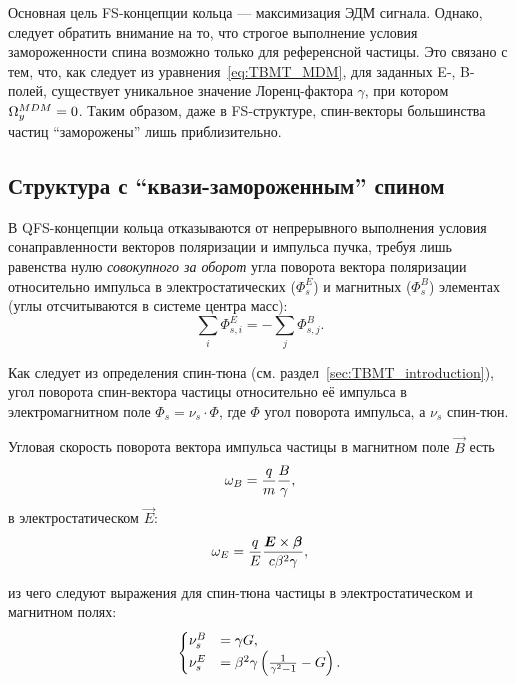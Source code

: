 Основная цель FS-концепции кольца --- максимизация ЭДМ сигнала. Однако, следует обратить внимание на то, что строгое выполнение условия замороженности спина возможно только для референсной частицы. Это связано с тем, что, как следует из уравнения~\eqref{eq:TBMT_MDM}, для заданных E-, B-полей, существует уникальное значение Лоренц-фактора $\gamma$, при котором $\Omega_y^{MDM} = 0$. Таким образом, даже в FS-структуре, спин-векторы большинства частиц ``заморожены'' лишь приблизительно.

\subsection{Структура с ``квази-замороженным'' спином} \label{chpt2:concept:QFS}
В QFS-концепции кольца отказываются от непрерывного выполнения условия сонаправленности векторов поляризации и импульса пучка, требуя лишь равенства нулю \emph{совокупного за оборот} угла поворота вектора поляризации относительно импульса в электростатических ($\Phi_s^E$) и магнитных ($\Phi_s^B$) элементах (углы отсчитываются в системе центра масс):~\cite{Senichev:Lattices}
\begin{equation*}
	\sum_i \Phi_{s,i}^E = -\sum_j \Phi_{s,j}^B.
\end{equation*}

Как следует из определения спин-тюна (см. раздел~\ref{sec:TBMT_introduction}), угол поворота спин-вектора частицы относительно её импульса в электромагнитном поле $\Phi_s = \nu_s \cdot \Phi$, где $\Phi$ угол поворота импульса, а $\nu_s$ спин-тюн.

Угловая скорость поворота вектора импульса частицы в магнитном поле $\vec B$ есть 
\[
\omega_B = \frac qm \frac B \gamma,
\]
в электростатическом $\vec E$:
\[
\omega_E = \frac qE \frac{\boldsymbol E\times \boldsymbol\beta}{c\beta^2\gamma},
\]

из чего следуют выражения для спин-тюна частицы в электростатическом и магнитном полях:
\begin{equation}
	\begin{cases}
		\nu_s^B &= \gamma G, \\
		\nu_s^E &= \beta^2\gamma\bkt{\frac{1}{\gamma^2-1} - G}.
	\end{cases}
\end{equation}

